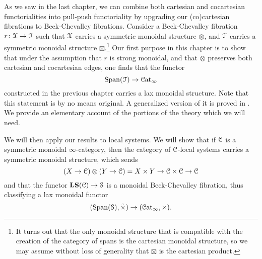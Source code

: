 \documentclass[main.tex]{subfiles}
\begin{document}
As we saw in the last chapter, we can combine both cartesian and cocartesian functorialities into pull-push functoriality by upgrading our (co)cartesian fibrations to Beck-Chevalley fibrations. Consider a Beck-Chevalley fibration $r\colon \mathcal{X} \to \mathcal{T}$ such that $\mathcal{X}$ carries a symmetric monoidal structure $\otimes$, and $\mathcal{T}$ carries a symmetric monoidal structure $\boxtimes$.\footnote{It turns out that the only monoidal structure that is compatible with the creation of the category of spans is the cartesian monoidal structure, so we may assume without loss of generality that $\boxtimes$ is the cartesian product.} Our first purpose in this chapter is to show that under the assumption that $r$ is strong monoidal, and that $\otimes$ preserves both cartesian and cocartesian edges, one finds that the functor
\begin{equation*}
  \mathrm{Span}(\mathcal{T}) \to \mathcal{C}\mathrm{at}_{\infty}
\end{equation*}
constructed in the previous chapter carries a lax monoidal structure. Note that this statement is by no means original. A generalized version of it is proved in \cite{spectralmackeyfunctors2}. We provide an elementary account of the portions of the theory which we will need.

We will then apply our results to local systems. We will show that if $\mathcal{C}$ is a symmetric monoidal $\infty$-category, then the category of $\mathcal{C}$-local systems carries a symmetric monoidal structure, which sends
\begin{equation*}
  (X \to \mathcal{C}) \otimes (Y \to \mathcal{C}) = X \times Y \to \mathcal{C} \times \mathcal{C} \to \mathcal{C}
\end{equation*}
and that the functor $\mathbf{LS}(\mathcal{C}) \to \mathcal{S}$ is a monoidal Beck-Chevalley fibration, thus classifying a lax monoidal functor
\begin{equation*}
  (\mathrm{Span}(\mathcal{S}), \tilde{\times}) \to (\mathcal{C}\mathrm{at}_{\infty}, \times).
\end{equation*}

\end{document}
